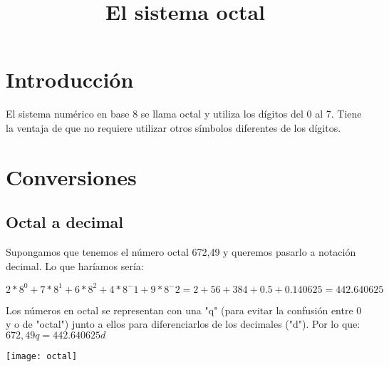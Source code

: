 \documentclass{article}
\title{El sistema octal}
\author{}
\date{}
\begin{document}
\maketitle

\thispagestyle{empty}  %

\section{Introducción}
El sistema numérico en base 8 se llama octal y utiliza los dígitos del 0 al 7. Tiene la ventaja de que no requiere utilizar otros símbolos diferentes de los dígitos.

\section{Conversiones}
\subsection{Octal a decimal}
Supongamos que tenemos el número octal 672,49 y queremos pasarlo a notación decimal. Lo que haríamos sería:
\begin{center}
$2*8^0 + 7*8^1 + 6*8^2 + 4*8^-1 + 9*8^-2 = 2 + 56 + 384 + 0.5 + 0.140625 = 442.640625$
\end{center}

Los números en octal se representan con una "q" (para evitar la confusión entre 0 y o de "octal") junto a ellos para diferenciarlos de los decimales ("d"). Por lo que: $672,49q = 442.640625d$

\texttt{[image: octal]}
\end{document}
